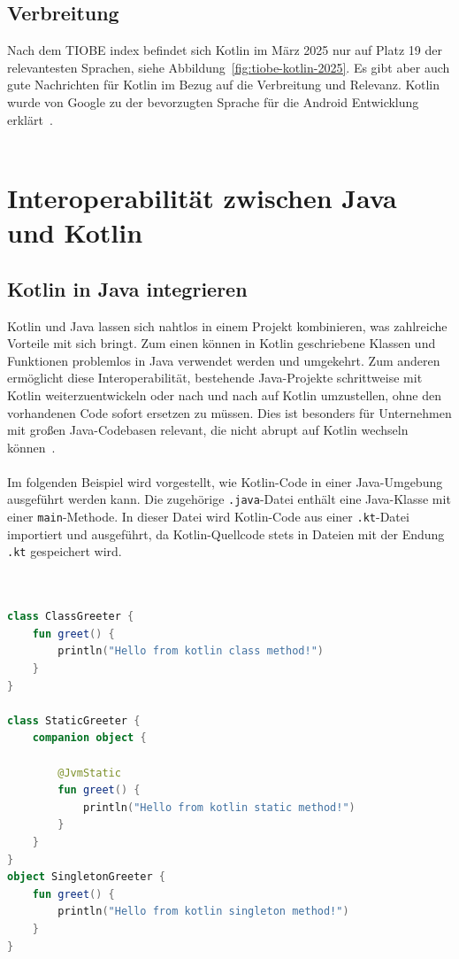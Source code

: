 \documentclass[11pt]{article}
\begin{document}
    \subsection{Verbreitung}
    Nach dem TIOBE index befindet sich Kotlin im März 2025 nur auf Platz 19 der relevantesten Sprachen, siehe Abbildung~\ref{fig:tiobe-kotlin-2025}.
    Es gibt aber auch gute Nachrichten für Kotlin im Bezug auf die Verbreitung und Relevanz.
    Kotlin wurde von Google zu der bevorzugten Sprache für die Android Entwicklung erklärt~\cite{tn3-google}.\\
    \\
    \section{Interoperabilität zwischen Java und Kotlin}

    \subsection{Kotlin in Java integrieren}
    Kotlin und Java lassen sich nahtlos in einem Projekt kombinieren, was zahlreiche Vorteile mit sich bringt.
    Zum einen können in Kotlin geschriebene Klassen und Funktionen problemlos in Java verwendet werden und umgekehrt.
    Zum anderen ermöglicht diese Interoperabilität, bestehende Java-Projekte schrittweise mit Kotlin weiterzuentwickeln oder nach und nach auf Kotlin umzustellen, ohne den vorhandenen Code sofort ersetzen zu müssen.
    Dies ist besonders für Unternehmen mit großen Java-Codebasen relevant, die nicht abrupt auf Kotlin wechseln können~\cite[20]{kotlin-handbuch}.\\
    \\
    Im folgenden Beispiel wird vorgestellt, wie Kotlin-Code in einer Java-Umgebung ausgeführt werden kann.
    Die zugehörige \texttt{.java}-Datei enthält eine Java-Klasse mit einer \texttt{main}-Methode.
    In dieser Datei wird Kotlin-Code aus einer \texttt{.kt}-Datei importiert und ausgeführt, da Kotlin-Quellcode stets
    in Dateien mit der Endung \texttt{.kt} gespeichert wird.\\
    \\

    \begin{lstlisting}[language=Kotlin, caption={KotlinGreeter.kt}]

class ClassGreeter {
    fun greet() {
        println("Hello from kotlin class method!")
    }
}

class StaticGreeter {
    companion object {

        @JvmStatic
        fun greet() {
            println("Hello from kotlin static method!")
        }
    }
}
object SingletonGreeter {
    fun greet() {
        println("Hello from kotlin singleton method!")
    }
}
    \end{lstlisting}
\end{document}
